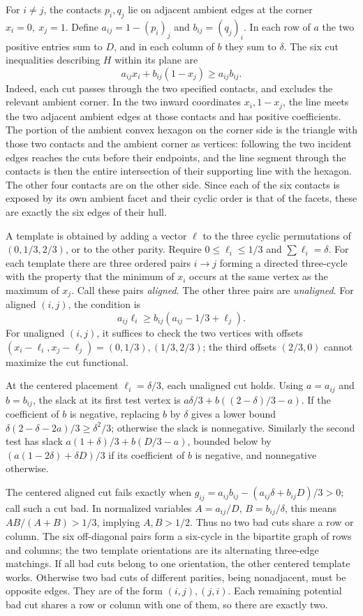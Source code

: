 \documentclass[
  10pt,
]{article}
\begin{document}
For \(i\ne j\), the contacts \(p_i,q_j\) lie on adjacent ambient edges
at the corner \(x_i=0,\ x_j=1\). Define \(a_{ij}=1-(p_i)_j\) and
\(b_{ij}=(q_j)_i\). In each row of \(a\) the two positive entries sum to
\(D\), and in each column of \(b\) they sum to \(\delta\). The six cut
inequalities describing \(H\) within its plane are \[
 a_{ij}x_i+b_{ij}(1-x_j)\ge a_{ij}b_{ij}. \tag{1}
\] Indeed, each cut passes through the two specified contacts, and
excludes the relevant ambient corner. In the two inward coordinates
\(x_i,1-x_j\), the line meets the two adjacent ambient edges at those
contacts and has positive coefficients. The portion of the ambient
convex hexagon on the corner side is the triangle with those two
contacts and the ambient corner as vertices: following the two incident
edges reaches the cuts before their endpoints, and the line segment
through the contacts is then the entire intersection of their supporting
line with the hexagon. The other four contacts are on the other side.
Since each of the six contacts is exposed by its own ambient facet and
their cyclic order is that of the facets, these are exactly the six
edges of their hull.

A template is obtained by adding a vector \(\ell\) to the three cyclic
permutations of \((0,1/3,2/3)\), or to the other parity. Require
\(0\le\ell_i\le1/3\) and \(\sum\ell_i=\delta\). For each template there
are three ordered pairs \(i\to j\) forming a directed three-cycle with
the property that the minimum of \(x_i\) occurs at the same vertex as
the maximum of \(x_j\). Call these pairs \emph{aligned}. The other three
pairs are \emph{unaligned}. For aligned \((i,j)\), the condition is \[
 a_{ij}\ell_i\ge b_{ij}(a_{ij}-1/3+\ell_j). \tag{2}
\] For unaligned \((i,j)\), it suffices to check the two vertices with
offsets \((x_i-\ell_i,x_j-\ell_j)=(0,1/3),(1/3,2/3)\); the third offsets
\((2/3,0)\) cannot maximize the cut functional.

At the centered placement \(\ell_i=\delta/3\), each unaligned cut holds.
Using \(a=a_{ij}\) and \(b=b_{ij}\), the slack at its first test vertex
is \(a\delta/3+b((2-\delta)/3-a)\). If the coefficient of \(b\) is
negative, replacing \(b\) by \(\delta\) gives a lower bound
\(\delta(2-\delta-2a)/3\ge\delta^2/3\); otherwise the slack is
nonnegative. Similarly the second test has slack
\(a(1+\delta)/3+b(D/3-a)\), bounded below by
\((a(1-2\delta)+\delta D)/3\) if its coefficient of \(b\) is negative,
and nonnegative otherwise.

The centered aligned cut fails exactly when
\(g_{ij}=a_{ij}b_{ij}-(a_{ij}\delta+b_{ij}D)/3>0\); call such a cut bad.
In normalized variables \(A=a_{ij}/D\), \(B=b_{ij}/\delta\), this means
\(AB/(A+B)>1/3\), implying \(A,B>1/2\). Thus no two bad cuts share a row
or column. The six off-diagonal pairs form a six-cycle in the bipartite
graph of rows and columns; the two template orientations are its
alternating three-edge matchings. If all bad cuts belong to one
orientation, the other centered template works. Otherwise two bad cuts
of different parities, being nonadjacent, must be opposite edges. They
are of the form \((i,j),(j,i)\). Each remaining potential bad cut shares
a row or column with one of them, so there are exactly two.
\end{document}
